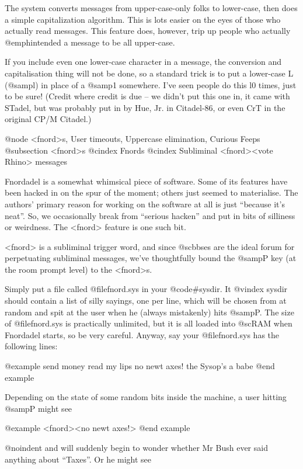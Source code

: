 {{{The system converts messages from upper-case-only folks to
lower-case, then does a simple capitalization algorithm.  This is
lots easier on the eyes of those who actually read messages.  This
feature does, however, trip up people who actually @emph{intended} a
message to be all upper-case.

If you include even one lower-case
character in a message, the conversion and capitalisation thing will
not be done, so a standard trick is to put a lower-case L (@samp{l}) in
place of a @samp{1} somewhere.  I've seen people do this l0 times,
just to be sure!  (Credit where credit is due -- we didn't
put this one in, it came with STadel, but was probably put in by
Hue, Jr. in Citadel-86, or even CrT in the original CP/M Citadel.)

@node <fnord>s, User timeouts, Uppercase elimination, Curious Feeps
@subsection <fnord>s
@cindex Fnords
@cindex Subliminal <fnord><vote Rhino> messages

Fnordadel is a somewhat whimsical piece of software.  Some of
its features have been hacked in on the spur of the moment; others just
seemed to materialise.  The authors' primary reason for working on the
software at all is just ``because it's neat''.  So, we occasionally break
from ``serious hacken'' and put in bits of silliness or weirdness.  The
<fnord> feature is one such bit.

<fnord> is a subliminal trigger word, and since @sc{bbs}es are
the ideal forum for perpetuating subliminal messages, we've
thoughtfully bound the @samp{P} key (at the room prompt level) to
the <fnord>s.

Simply put a file called @file{fnord.sys} in your @code{#sysdir}.  It
@vindex sysdir
should contain a list of silly sayings, one per line, which will be chosen
from at random and spit at the user when he (always mistakenly) hits @samp{P}.  The size of @file{fnord.sys} is practically unlimited, but it is all loaded
into @sc{RAM} when Fnordadel starts, so be very careful.
Anyway, say your @file{fnord.sys} has the following lines:

@example
send money
read my lips
no newt axes!
the Sysop's a babe
@end example

Depending on the state of some random bits inside the machine, a
user hitting @samp{P} might see

@example
<fnord><no newt axes!>
@end example

@noindent
and will suddenly begin to wonder whether Mr Bush ever said
anything about ``Taxes''.  Or he might see

}}}
